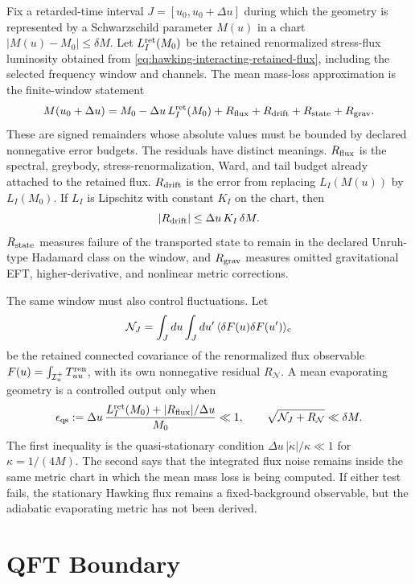 \begin{controlledapproximation}
\label{ca:hawking-flux-to-mass-window}
Fix a retarded-time interval \(J=[u_0,u_0+\Delta u]\) during which the
geometry is represented by a Schwarzschild parameter \(M(u)\) in a chart
\(|M(u)-M_0|\leq \delta M\).  Let \(L_I^{\rm ret}(M_0)\) be the retained
renormalized stress-flux luminosity obtained from
\eqref{eq:hawking-interacting-retained-flux}, including the selected
frequency window and channels.  The mean mass-loss approximation is the
finite-window statement
\[
  M(u_0+\Delta u)
  =
  M_0-\Delta u\,L_I^{\rm ret}(M_0)
  +R_{\rm flux}+R_{\rm drift}+R_{\rm state}+R_{\rm grav}.
\]
These are signed remainders whose absolute values must be bounded by declared
nonnegative error budgets.  The residuals have distinct meanings.
\(R_{\rm flux}\) is the spectral, greybody, stress-renormalization, Ward, and
tail budget already attached to the retained flux.  \(R_{\rm drift}\) is the
error from replacing \(L_I(M(u))\) by \(L_I(M_0)\).  If \(L_I\) is Lipschitz
with constant \(K_I\) on the chart, then
\[
  |R_{\rm drift}|
  \leq
  \Delta u\,K_I\,\delta M .
\]
\(R_{\rm state}\) measures failure of the transported state to remain in the
declared Unruh-type Hadamard class on the window, and \(R_{\rm grav}\)
measures omitted gravitational EFT, higher-derivative, and nonlinear metric
corrections.

The same window must also control fluctuations.  Let
\[
  \mathcal N_J
  =
  \int_J du\int_J du'\,
  \langle \delta F(u)\delta F(u')\rangle_{\rm c}
\]
be the retained connected covariance of the renormalized flux observable
\(F(u)=\int_{\mathcal I^+_u}T_{uu}^{\rm ren}\), with its own nonnegative
residual \(R_{\mathcal N}\).  A mean evaporating geometry is a controlled
output only when
\[
  \epsilon_{\rm qs}
  :=
  \Delta u\,
  \frac{L_I^{\rm ret}(M_0)+|R_{\rm flux}|/\Delta u}
       {M_0}
  \ll 1,
  \qquad
  \sqrt{\mathcal N_J+R_{\mathcal N}}\ll \delta M .
\]
The first inequality is the quasi-stationary condition
\(\Delta u\,|\dot\kappa|/\kappa\ll1\) for \(\kappa=1/(4M)\).  The second says
that the integrated flux noise remains inside the same metric chart in which
the mean mass loss is being computed.  If either test fails, the stationary
Hawking flux remains a fixed-background observable, but the adiabatic
evaporating metric has not been derived.
\end{controlledapproximation}

\section{QFT Boundary}

